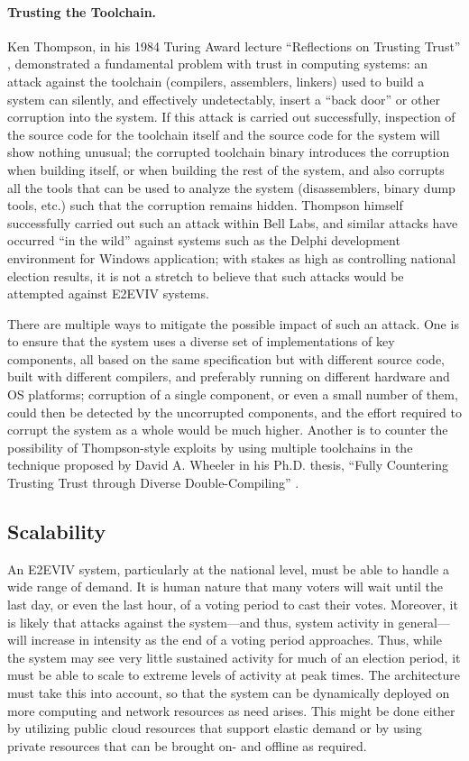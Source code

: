 \paragraph{Trusting the Toolchain.} Ken Thompson, in his 1984 Turing
Award lecture ``Reflections on Trusting Trust'' \cite{Thompson84},
demonstrated a fundamental problem with trust in computing systems: an
attack against the toolchain (compilers, assemblers, linkers) used to
build a system can silently, and effectively undetectably, insert a
``back door'' or other corruption into the system. If this attack is
carried out successfully, inspection of the source code for the
toolchain itself and the source code for the system will show nothing
unusual; the corrupted toolchain binary introduces the corruption when
building itself, or when building the rest of the system, and also
corrupts all the tools that can be used to analyze the system
(disassemblers, binary dump tools, etc.) such that the corruption
remains hidden. Thompson himself successfully carried out such an
attack within Bell Labs, and similar attacks have occurred ``in the
wild'' against systems such as the Delphi development environment for
Windows application; with stakes as high as controlling national
election results, it is not a stretch to believe that such attacks
would be attempted against E2EVIV systems.

There are multiple ways to mitigate the possible impact of such an
attack. One is to ensure that the system uses a diverse set of
implementations of key components, all based on the same specification
but with different source code, built with different compilers, and
preferably running on different hardware and OS platforms; corruption
of a single component, or even a small number of them, could then be
detected by the uncorrupted components, and the effort required to
corrupt the system as a whole would be much higher. Another is to
counter the possibility of Thompson-style exploits by using multiple
toolchains in the technique proposed by David A. Wheeler in his
Ph.D. thesis, ``Fully Countering Trusting Trust through Diverse
Double-Compiling'' \cite{Wheeler09}.

\subsection{Scalability}

An E2EVIV system, particularly at the national level, must be able to
handle a wide range of demand. It is human nature that many voters
will wait until the last day, or even the last hour, of a voting
period to cast their votes. Moreover, it is likely that attacks
against the system---and thus, system activity in general---will
increase in intensity as the end of a voting period approaches. Thus,
while the system may see very little sustained activity for much of an
election period, it must be able to scale to extreme levels of
activity at peak times. The architecture must take this into account,
so that the system can be dynamically deployed on more computing and
network resources as need arises. This might be done either by
utilizing public cloud resources that support elastic demand or by
using private resources that can be brought on- and offline as
required.

